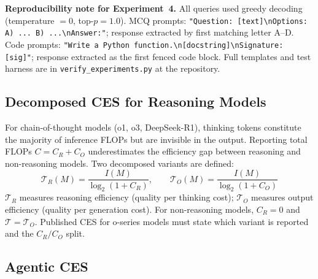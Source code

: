 \documentclass[12pt]{article}
\begin{document}
\noindent\textbf{Reproducibility note for Experiment~4.} All queries used greedy decoding (temperature $= 0$, top-$p = 1.0$). MCQ prompts: \texttt{"Question: [text]\textbackslash nOptions: A)~... B)~...\textbackslash nAnswer:"}; response extracted by first matching letter A--D. Code prompts: \texttt{"Write a Python function.\textbackslash n[docstring]\textbackslash nSignature: [sig]"}; response extracted as the first fenced code block. Full templates and test harness are in \texttt{verify\_experiments.py} at the repository.

\subsection{Decomposed CES for Reasoning Models}
\label{sec:decomposed-ces}

For chain-of-thought models (o1, o3, DeepSeek-R1), thinking tokens constitute the majority of inference FLOPs but are invisible in the output. Reporting total FLOPs $C = C_R + C_O$ underestimates the efficiency gap between reasoning and non-reasoning models. Two decomposed variants are defined:
\begin{equation}
\mathcal{T}_R(M) = \frac{I(M)}{\log_2(1+C_R)}, \qquad
\mathcal{T}_O(M) = \frac{I(M)}{\log_2(1+C_O)}
\end{equation}
$\mathcal{T}_R$ measures reasoning efficiency (quality per thinking cost); $\mathcal{T}_O$ measures output efficiency (quality per generation cost). For non-reasoning models, $C_R = 0$ and $\mathcal{T} = \mathcal{T}_O$. Published CES for o-series models must state which variant is reported and the $C_R / C_O$ split.

\subsection{Agentic CES}
\label{sec:agentic-ces}
\end{document}
